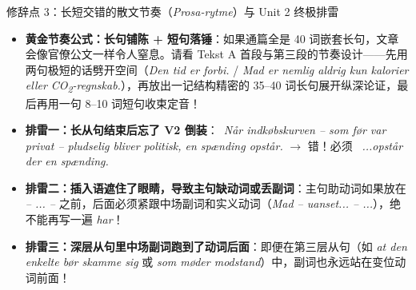 \begin{grammatikbox}{修辞点 3：长短交错的散文节奏（\textit{Prosa-rytme}）与 Unit 2 终极排雷}
\begin{itemize}
  \item \textbf{黄金节奏公式：长句铺陈 + 短句落锤}：如果通篇全是 40 词嵌套长句，文章会像官僚公文一样令人窒息。请看 Tekst A 首段与第三段的节奏设计——先用两句极短的话劈开空间（\textit{Den tid er forbi.} / \textit{Mad er nemlig aldrig kun kalorier eller CO\textsubscript{2}-regnskab.}），再放出一记结构精密的 35--40 词长句展开纵深论证，最后再用一句 8--10 词短句收束定音！
  \item \textbf{ 排雷一：长从句结束后忘了 V2 倒装}：\ \textit{Når indkøbskurven -- som før var privat -- pludselig bliver politisk, en spænding opstår.} $\rightarrow$ 错！必须 \ \textit{...opstår der en spænding.}
  \item \textbf{ 排雷二：插入语遮住了眼睛，导致主句缺动词或丢副词}：主句助动词如果放在 \textit{-- ... --} 之前，后面必须紧跟中场副词和实义动词（\textit{Mad  -- uanset... -- ...}），绝不能再写一遍 \textit{har}！
  \item \textbf{ 排雷三：深层从句里中场副词跑到了动词后面}：即便在第三层从句（如 \textit{at den enkelte  bør skamme sig} 或 \textit{som  møder modstand}）中，副词也永远站在变位动词前面！
\end{itemize}
\end{grammatikbox}


